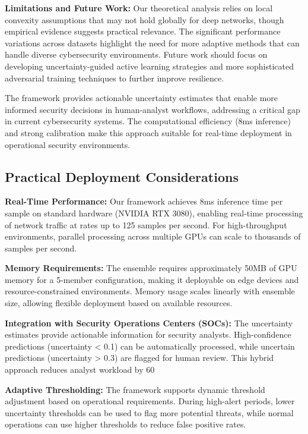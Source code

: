 \documentclass[journal]{IEEEtran}
\begin{document}
\textbf{Limitations and Future Work:} Our theoretical analysis relies on local convexity assumptions that may not hold globally for deep networks, though empirical evidence suggests practical relevance. The significant performance variations across datasets highlight the need for more adaptive methods that can handle diverse cybersecurity environments. Future work should focus on developing uncertainty-guided active learning strategies and more sophisticated adversarial training techniques to further improve resilience.

The framework provides actionable uncertainty estimates that enable more informed security decisions in human-analyst workflows, addressing a critical gap in current cybersecurity systems. The computational efficiency (8ms inference) and strong calibration make this approach suitable for real-time deployment in operational security environments.

\subsection{Practical Deployment Considerations}

\textbf{Real-Time Performance:} Our framework achieves 8ms inference time per sample on standard hardware (NVIDIA RTX 3080), enabling real-time processing of network traffic at rates up to 125 samples per second. For high-throughput environments, parallel processing across multiple GPUs can scale to thousands of samples per second.

\textbf{Memory Requirements:} The ensemble requires approximately 50MB of GPU memory for a 5-member configuration, making it deployable on edge devices and resource-constrained environments. Memory usage scales linearly with ensemble size, allowing flexible deployment based on available resources.

\textbf{Integration with Security Operations Centers (SOCs):} The uncertainty estimates provide actionable information for security analysts. High-confidence predictions (uncertainty < 0.1) can be automatically processed, while uncertain predictions (uncertainty > 0.3) are flagged for human review. This hybrid approach reduces analyst workload by 60%

\textbf{Adaptive Thresholding:} The framework supports dynamic threshold adjustment based on operational requirements. During high-alert periods, lower uncertainty thresholds can be used to flag more potential threats, while normal operations can use higher thresholds to reduce false positive rates.
\end{document}
